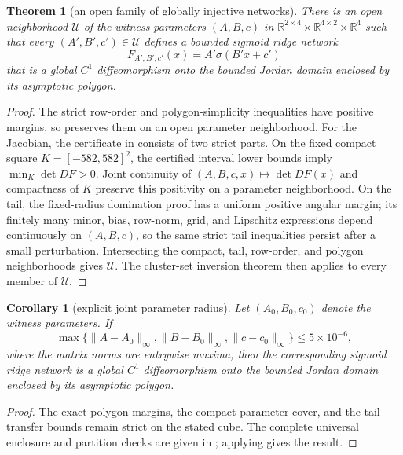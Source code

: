 \documentclass[11pt,twoside,leqno]{article}
\theoremstyle{plain}
\newtheorem{theorem}{Theorem}[section]
\newtheorem{corollary}[corollary]{Corollary}
\theoremstyle{definition}
\theoremstyle{remark}
\newcommand{\R}{\mathbb{R}}
\newcommand{\norm}[1]{\lVert #1 \rVert}
\begin{document}
\begin{theorem}[an open family of globally injective networks]\label{thm:open-family}
There is an open neighborhood $\mathcal U$ of the witness parameters $(A,B,c)$ in $\R^{2\times4}\times\R^{4\times2}\times\R^4$ such that every $(A',B',c')\in\mathcal U$ defines a bounded sigmoid ridge network
\[
 F_{A',B',c'}(x)=A'\sigma(B'x+c')
\]
that is a global $C^1$ diffeomorphism onto the bounded Jordan domain enclosed by its asymptotic polygon.
\end{theorem}

\begin{proof}
The strict row-order and polygon-simplicity inequalities have positive margins, so  preserves them on an open parameter neighborhood. For the Jacobian, the certificate in  consists of two strict parts. On the fixed compact square $K=[-582,582]^2$, the certified interval lower bounds imply $\min_K\det DF>0$.  Joint continuity of $(A,B,c,x)\mapsto\det DF(x)$ and compactness of $K$ preserve this positivity on a parameter neighborhood.  On the tail, the fixed-radius domination proof has a uniform positive angular margin; its finitely many minor, bias, row-norm, grid, and Lipschitz expressions depend continuously on $(A,B,c)$, so the same strict tail inequalities persist after a small perturbation.  Intersecting the compact, tail, row-order, and polygon neighborhoods gives $\mathcal U$.  The cluster-set inversion theorem then applies to every member of $\mathcal U$.
\end{proof}

\begin{corollary}[explicit joint parameter radius]\label{cor:family-radius}
Let $(A_0,B_0,c_0)$ denote the witness parameters.  If
\[
 \max\{\norm{A-A_0}_\infty,\norm{B-B_0}_\infty,
          \norm{c-c_0}_\infty\}\le 5\times10^{-6},
\]
where the matrix norms are entrywise maxima, then the corresponding sigmoid ridge network is a global $C^1$ diffeomorphism onto the bounded Jordan domain enclosed by its asymptotic polygon.
\end{corollary}

\begin{proof}
The exact polygon margins, the compact parameter cover, and the tail-transfer bounds remain strict on the stated cube.  The complete universal enclosure and partition checks are given in ; applying  gives the result.
\end{proof}
\end{document}
